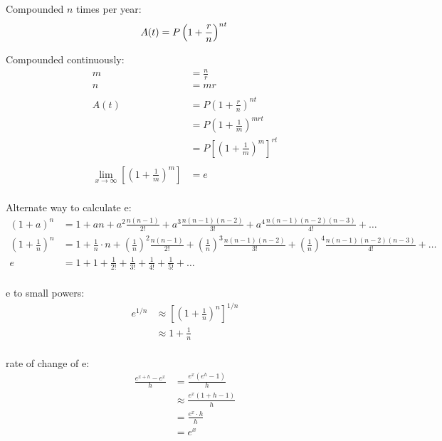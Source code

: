\documentclass{exam}
\begin{document}
  Compounded $n$ times per year: 
  \[
    A(t) = P \left( 1 + \frac{r}{n} \right)^{nt} \\
  \]

  Compounded continuously:
  \begin{align*}
    m &= \frac{n}{r} \\
    n &= mr \\
    \\
    A(t) &= P\left(1 + \frac{r}{n}\right)^{nt} \\
         &= P\left(1 + \frac{1}{m}\right)^{mrt} \\
         &= P \left[ \left(1 + \frac{1}{m}\right)^{m} \right]^{rt} \\
    \\
    \lim_{x \to \infty} \left[ \left(1 + \frac{1}{m}\right)^{m} \right] &= e \\
  \end{align*}

  Alternate way to calculate e:
  \begin{align*}
    (1 + a)^n                        &= 1 + an + a^2 \frac{n (n - 1)}{2!} + a^3 \frac{n(n-1)(n-2)}{3!} + a^4 \frac{n(n-1)(n-2)(n-3)}{4!} + \ldots \\
    \left( 1 + \frac{1}{n} \right)^n &= 1 + \frac{1}{n} \cdot n + \left( \frac{1}{n} \right)^2 \frac{ n (n - 1)}{2!}
        + \left( \frac{1}{n} \right)^3 \frac{n(n-1)(n-2)}{3!} + \left( \frac{1}{n} \right)^4 \frac{n(n-1)(n-2)(n-3)}{4!} + \ldots \\
        e &= 1 + 1 + \frac{1}{2!} + \frac{1}{3!} + \frac{1}{4!} + \frac{1}{5!} + \ldots \\
  \end{align*}

  e to small powers:
  \begin{align*}
    e^{1/n} &\approx \left[ \left( 1 + \frac{1}{n} \right)^n \right]^{1/n} \\
            &\approx 1 + \frac{1}{n} \\
  \end{align*}

  rate of change of e:
  \begin{align*}
    \frac{e^{x + h} - e^x}{h} & = \frac{e^x \left( e^h - 1 \right)}{h} \\
                              & \approx \frac{e^x \left( 1 + h - 1 \right)}{h} \\
                              & = \frac{e^x \cdot h}{h} \\
                              & = e^x \\
  \end{align*}
\end{document}

